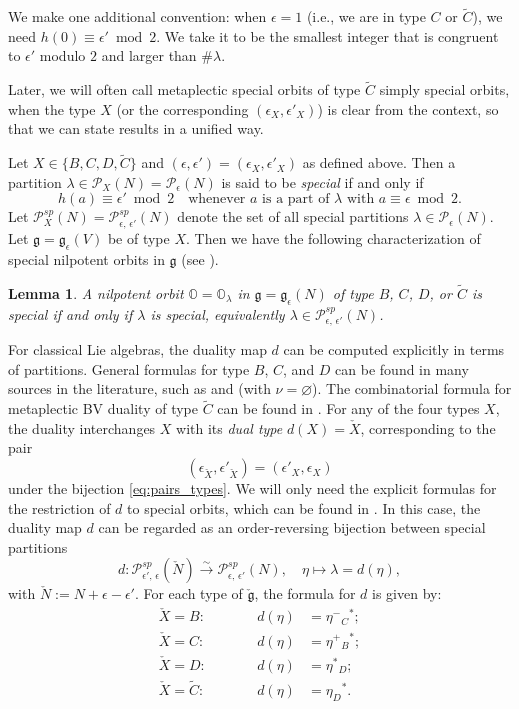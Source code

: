 \documentclass[11pt, a4paper]{amsart}
\newcommand{\g}{\mathfrak{g}}
\newcommand{\orb}{\mathbb{O}}
\newcommand{\fg}{\mathfrak{g}}
\newcommand{\ckfg}{{\check{\fg}}}
\newcommand{\cP}{\mathcal{P}}
\newcommand{\mC}{\widetilde{C}}
\newcommand{\Pe}{\cP_\epsilon}
\newcommand{\Pee}{\cP^{sp}_{\epsilon,\,\epsilon'}}
\newtheorem{Lem}[Thm]{Lemma}
\theoremstyle{definition}
\numberwithin{equation}{section}
\begin{document}
We make one additional convention:
when $\epsilon = 1$ (i.e., we are in type $C$ or $\mC$), we need $h(0) \equiv \epsilon' \bmod 2$. We take it to be the smallest integer that is congruent to $\epsilon'$ modulo $2$ and larger than $\#\lambda$. 

Later, we will often call metaplectic special orbits of type $\mC$ simply special orbits, when the type $X$ (or the corresponding $(\epsilon_X,\epsilon'_X)$) is clear from the context, so that we can state results in a unified way.

Let $X \in \{B, C, D, \mC\}$ and $(\epsilon, \epsilon') = (\epsilon_X,\epsilon'_X)$ as defined above. 
Then a partition $\lambda \in \cP_X(N) = \Pe(N)$ is said to be {\it special} if and only if 
	\[ h(a) \equiv \epsilon' \bmod 2 \quad \text{whenever } a \text{ is a part of } \lambda \text{ with } a \equiv \epsilon \bmod 2. \]
Let $\cP_X^{sp}(N) = \Pee(N)$ denote the set of all special partitions $\lambda \in \Pe(N)$. Let $\g = \g_\epsilon(V)$ be of type $X$. Then we have the following characterization of special nilpotent orbits in $\g$ (see \cite[Section 2.2]{JLS:Duality}).

\begin{Lem} \label{lem:special_classical}
	A nilpotent orbit $\orb = \orb_\lambda$ in $\g = \g_\epsilon(N)$ of type $B$, $C$, $D$, or $\mC$ is special if and only if $\lambda$ is special, equivalently $\lambda \in \Pee(N)$.
\end{Lem}

For classical Lie algebras, the duality map $d$ can be computed explicitly in terms of partitions. General formulas for type $B$, $C$, and $D$ can be found in many sources in the literature, such as \cite[Theorem 5.1]{McGovern1994} and \cite[Theorem 12]{Sommers:Duality} (with $\nu = \varnothing$). The combinatorial formula for metaplectic BV duality of type $\mC$ can be found in \cite{BMSZ:metaplecticBV}. For any of the four types $X$, the duality interchanges $X$ with its {\it dual type} $d(X)=\check{X}$, corresponding to the pair 
	\[ (\epsilon_{\check{X}}, \epsilon'_{\check{X}}) = (\epsilon'_X, \epsilon_X) \]
under the bijection \eqref{eq:pairs_types}.
We will only need the explicit formulas for the restriction of $d$ to special orbits, which can be found in \cite[Sections 2.2 and 2.3]{JLS:Duality}. In this case, the duality map $d$ can be regarded as an order-reversing bijection between special partitions
	\[ d: \cP_{\epsilon',\,\epsilon}^{sp}(\check{N}) \xrightarrow{\sim} \Pee(N), \quad \eta \mapsto \lambda = d(\eta), \]
with $\check{N} := N + \epsilon - \epsilon'$. For each type of $\ckfg$, the formula for $d$ is given by:
\begin{equation}\label{eq:dBV_classical}
\begin{aligned}
	\check{X}=B:   &\qquad& d(\eta) &= \eta^-\!_C\!^*;  \\
	\check{X}=C:   &\qquad& d(\eta) &= \eta^+\!_B\!^*; \\
	\check{X}=D:   &\qquad& d(\eta) &= \eta^*\!_D;  \\
	\check{X}=\mC: &\qquad& d(\eta) &= \eta_D\!^*.  \\
\end{aligned}
\end{equation}
\end{document}
